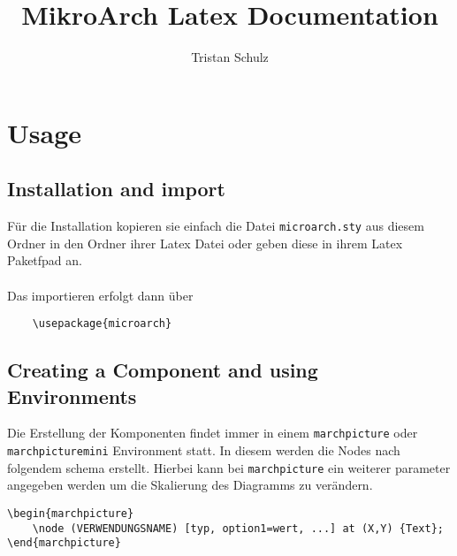 \documentclass[
	ngerman,
	accentcolor=9c,%
	type=intern,
	marginpar=false
	]{article}
\begin{document}


\title{MikroArch Latex Documentation}
\author{Tristan Schulz}

\maketitle

\tableofcontents

\section{Usage}

\subsection{Installation and import}

Für die Installation kopieren sie einfach die Datei \lstinline|microarch.sty| aus diesem Ordner in den Ordner ihrer Latex Datei oder geben diese in ihrem Latex Paketfpad an.
\\\\
Das importieren erfolgt dann über
\begin{lstlisting}
	\usepackage{microarch}
\end{lstlisting}

\subsection{Creating a Component and using Environments}

Die Erstellung der Komponenten findet immer in einem \lstinline|marchpicture| oder \lstinline|marchpicturemini| Environment statt. In diesem werden die Nodes nach folgendem schema erstellt. Hierbei kann bei \lstinline|marchpicture| ein weiterer parameter angegeben werden um die Skalierung des Diagramms zu verändern.
\begin{lstlisting}
\begin{marchpicture}
	\node (VERWENDUNGSNAME) [typ, option1=wert, ...] at (X,Y) {Text};
\end{marchpicture}
\end{lstlisting}
\end{document}
